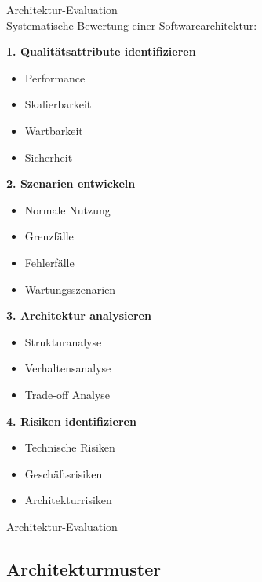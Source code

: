 \begin{KR}{Architektur-Evaluation}\\
Systematische Bewertung einer Softwarearchitektur:

\textbf{1. Qualitätsattribute identifizieren}
\begin{itemize}
    \item Performance
    \item Skalierbarkeit
    \item Wartbarkeit
    \item Sicherheit
\end{itemize}

\textbf{2. Szenarien entwickeln}
\begin{itemize}
    \item Normale Nutzung
    \item Grenzfälle
    \item Fehlerfälle
    \item Wartungsszenarien
\end{itemize}

\textbf{3. Architektur analysieren}
\begin{itemize}
    \item Strukturanalyse
    \item Verhaltensanalyse
    \item Trade-off Analyse
\end{itemize}

\textbf{4. Risiken identifizieren}
\begin{itemize}
    \item Technische Risiken
    \item Geschäftsrisiken
    \item Architekturrisiken
\end{itemize}
\end{KR}

\begin{example2}{Architektur-Evaluation}\\
\end{example2}


\pagebreak


\subsection{Architekturmuster}


